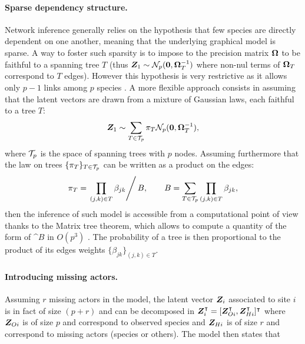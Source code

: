 \paragraph{Sparse dependency structure.} Network inference generally relies on the hypothesis that few species are directly dependent on one another, meaning that the underlying graphical model is sparse. A way to foster such sparsity is to impose to the precision matrix $\boldsymbol{\Omega}$ to be faithful to a spanning tree $T$ (thus $\boldsymbol{Z}_1 \sim \mathcal{N}_p(\boldsymbol{0}, \boldsymbol{\Omega}_T^{-1})$ where non-nul terms of $\boldsymbol{\Omega}_T$ correspond to $T$ edges). However this hypothesis is very restrictive  as it allows only $p-1$ links among $p$ species \citep{ChowLiu}. A more flexible approach consists in assuming that the latent vectors are drawn from a mixture of Gaussian laws, each faithful to a tree $T$:
\begin{equation} \label{eq:mixt-Z}
\boldsymbol{Z}_1 \sim \sum_{T \in \mathcal{T}_p} \pi_T \mathcal{N}_p(\boldsymbol{0}, \boldsymbol{\Omega}_T^{-1}),
\end{equation}
where $\mathcal{T}_p$ is the space of spanning trees with $p$ nodes.
Assuming furthermore that the law on trees $\{\pi_T\}_{T \in \mathcal{T}_p}$ can be written as a product on the edges:
\begin{equation} \label{eq:prob-T}
\pi_T = \left. \prod_{(j, k) \in T} \beta_{jk} \right/ B, \qquad
B = \sum_{T \in \mathcal{T}_p} \prod_{(j, k) \in T} \beta_{jk},
\end{equation}
then the inference of such model is accessible from a computational point of view thanks to the Matrix tree theorem, which allows to compute a quantity of the form of ^$B$ in  $O(p^3)$ \citep{matrixtree,MeilaJaak,kirshner}. The probability of a tree is then proportional to the product of its edges weights $\{\beta_{jk}\}_{(j,k)\in T}$.

\paragraph{Introducing missing actors.} 

Assuming $r$ missing actors in the model, the latent vector $\boldsymbol{Z}_i$ associated to site $i$ is in fact of size $(p+r)$ and can be decomposed in $\boldsymbol{Z}_i^\intercal = [\boldsymbol{Z}_{Oi}^\intercal, \boldsymbol{Z}_{Hi}^\intercal]^\intercal$ where $\boldsymbol{Z}_{Oi}$ is of size $p$ and correspond to observed species and $\boldsymbol{Z}_{Hi}$ is of size $r$ and correspond to missing actors (species or others). The model then states that

